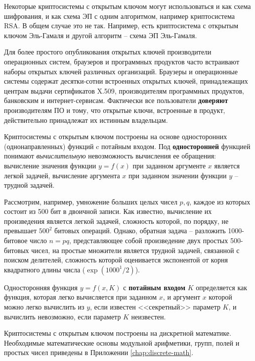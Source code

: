 \documentclass[10pt,a4paper]{book}
\begin{document}
Некоторые криптосистемы с открытым ключом могут использоваться и как схема шифрования, и как схема ЭП с одним алгоритмом, например криптосистема RSA. В общем случае это не так. Например, есть криптосистема с открытым ключом Эль-Гамаля и другой алгоритм -- схема ЭП Эль-Гамаля.

Для более простого опубликования открытых ключей производители операционных систем, браузеров и программных продуктов часто встраивают наборы открытых ключей различных организаций. Браузеры и операционные системы содержат десятки-сотни встроенных открытых ключей, принадлежащих центрам выдачи сертификатов X.509, производителям программных продуктов, банковским и интернет-сервисам. Фактически все пользователи \textbf{доверяют} производителям ПО и тому, что открытые ключи, встроенные в продукт, действительно принадлежат их истинным владельцам.

Криптосистемы с открытым ключом построены на основе односторонних (однонаправленных) функций c потайным входом. Под \textbf{односторонней} функцией понимают \emph{вычислительную} невозможность вычисления ее обращения: вычисление значения функции $y = f(x)$ при заданном аргументе $x$ является легкой задачей, вычисление аргумента $x$ при заданном значении функции $y$ -- трудной задачей.

Рассмотрим, например, умножение больших целых чисел $p,q$, каждое из которых состоит из 500 бит в двоичной записи. Как известно, вычисление их произведения является легкой задачей, сложность которой, по порядку, не превышает $500^2$ битовых операций. Однако, обратная задача -- разложить 1000-битовое число $n=pq$, представляющее собой произведение двух простых 500-битовых чисел, на простые множители является трудной задачей, связанной с поиском делителей, сложность которой оценивается экспонентой от корня квадратного длины числа ($ \exp(1000^1/2)$).

Односторонняя функция $y = f(x,K)$ с \textbf{потайным входом} $K$ определяется как функция, которая легко вычисляется при заданном $x$, и аргумент $x$ которой можно легко вычислить из $y$, если известен <<секретный>> параметр $K$, и вычислить невозможно, если параметр $K$ неизвестен.

Криптосистемы с открытым ключом построены на дискретной математике. Необходимые математические основы модульной арифметики, групп, полей и простых чисел приведены в Приложении \ref{chap:discrete-math}.


\end{document}
